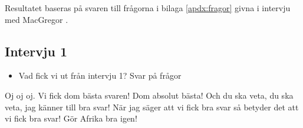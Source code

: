 

Resultatet baseras på svaren till frågorna i bilaga \ref{apdx:fragor} givna i intervju med MacGregor \cite{daniel}.

%
%

\subsection{Intervju 1}
\begin{itemize}
    \item Vad fick vi ut från intervju 1? Svar på frågor
\end{itemize}
Oj oj oj.
Vi fick dom bästa svaren!
Dom absolut bästa!
Och du ska veta, du ska veta, jag känner till bra svar!
När jag säger att vi fick bra svar så betyder det att vi fick bra svar!
Gör Afrika bra igen!

%
%


%
%




